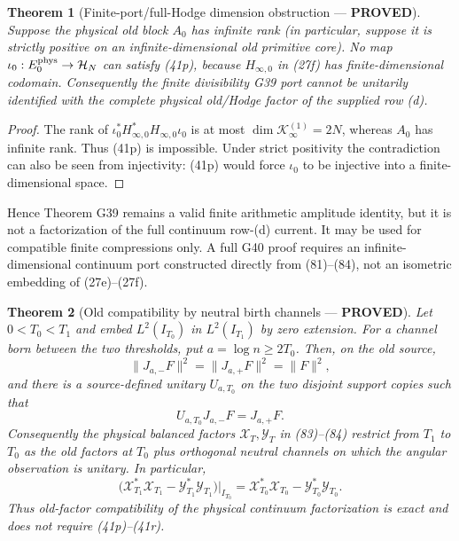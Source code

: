 \documentclass[11pt]{article}
\newtheorem{theorem}{Theorem}
\newcommand{\PROVED}{\textcolor{green!45!black}{\textbf{PROVED}}}
\begin{document}
\begin{theorem}[Finite-port/full-Hodge dimension obstruction --- \PROVED]
Suppose the physical old block $A_0$ has infinite rank (in particular, suppose
it is strictly positive on an infinite-dimensional old primitive core).  No
map $\iota_0:E_0^{\rm phys}\to\mathcal H_N$ can satisfy (41p), because
$H_{\infty,0}$ in (27f) has finite-dimensional codomain.  Consequently the
finite divisibility G39 port cannot be unitarily identified with the complete
physical old/Hodge factor of the supplied row (d).
\end{theorem}

\begin{proof}
The rank of
$\iota_0^*H_{\infty,0}^*H_{\infty,0}\iota_0$ is at most
$\dim\mathcal K_\infty^{(1)}=2N$, whereas $A_0$ has infinite rank.  Thus
(41p) is impossible.  Under strict positivity the contradiction can also be
seen from injectivity: (41p) would force $\iota_0$ to be injective into a
finite-dimensional space.
\end{proof}

Hence Theorem G39 remains a valid finite arithmetic amplitude identity, but
it is not a factorization of the full continuum row-(d) current.  It may be
used for compatible finite compressions only.  A full G40 proof requires an
infinite-dimensional continuum port constructed directly from (81)--(84),
not an isometric embedding of (27e)--(27f).

\begin{theorem}[Old compatibility by neutral birth channels --- \PROVED]
Let $0<T_0<T_1$ and embed $L^2(I_{T_0})$ in $L^2(I_{T_1})$ by zero
extension.  For a channel born between the two thresholds, put
$a=\log n\ge2T_0$.  Then, on the old source,
\begin{equation}
 \|J_{a,-}F\|^2=\|J_{a,+}F\|^2=\|F\|^2,             \tag{41s}
\end{equation}
and there is a source-defined unitary $U_{a,T_0}$ on the two disjoint support
copies such that
\begin{equation}
             U_{a,T_0}J_{a,-}F=J_{a,+}F.             \tag{41t}
\end{equation}
Consequently the physical balanced factors $\mathcal X_T,\mathcal Y_T$ in
(83)--(84) restrict from $T_1$ to $T_0$ as the old factors at $T_0$ plus
orthogonal neutral channels on which the angular observation is unitary.
In particular,
\begin{equation}
 \bigl(\mathcal X_{T_1}^*\mathcal X_{T_1}
       -\mathcal Y_{T_1}^*\mathcal Y_{T_1}\bigr)\big|_{I_{T_0}}
 =\mathcal X_{T_0}^*\mathcal X_{T_0}
       -\mathcal Y_{T_0}^*\mathcal Y_{T_0}.          \tag{41u}
\end{equation}
Thus old-factor compatibility of the \emph{physical continuum
factorization} is exact and does not require (41p)--(41r).
\end{theorem}
\end{document}
